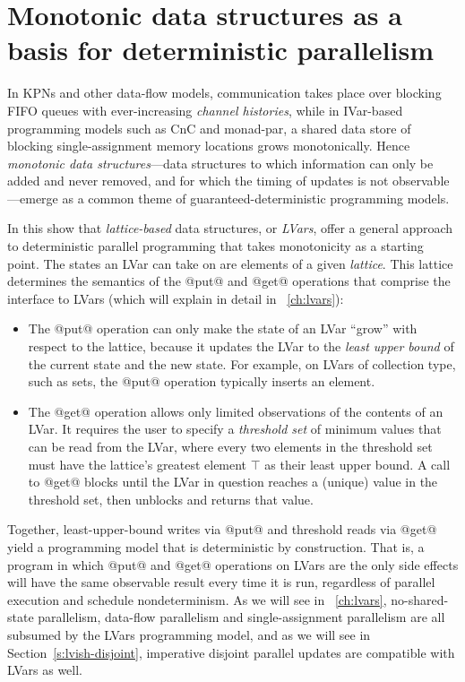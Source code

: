 \section{Monotonic data structures as a basis for deterministic parallelism}\label{s:intro-monotonic}

In KPNs and other data-flow models, communication takes place over
blocking FIFO queues with ever-increasing \emph{channel histories},
while in IVar-based programming models such as CnC and monad-par, a
shared data store of blocking single-assignment memory locations grows
monotonically.  Hence \emph{monotonic data structures}---data
structures to which information can only be added and never removed,
and for which the timing of updates is not observable---emerge as a
common theme of guaranteed-deterministic programming models.

In this  show that \emph{lattice-based} data
structures, or \emph{LVars}, offer a general approach to deterministic
parallel programming that takes monotonicity as a starting point. The
states an LVar can take on are elements of a given
\emph{lattice}.  This lattice determines the
semantics of the @put@ and @get@ operations that comprise the
interface to LVars (which  will explain in detail in
~\ref{ch:lvars}):
\begin{itemize}
\item The @put@ operation can only make the state of an LVar ``grow''
  with respect to the lattice, because it updates the LVar to the
  \emph{least upper bound} of the current state and the new state.
  For example, on LVars of collection type, such as sets, the @put@ operation
  typically inserts an element.

\item The @get@ operation allows only limited observations of the
  contents of an LVar.  It requires the user to specify a
  \emph{threshold set} of minimum values that can be read from the
  LVar, where every two elements in the threshold set must have the
  lattice's greatest element $\top$ as their least upper bound.  A
  call to @get@ blocks until the LVar in question reaches a (unique)
  value in the threshold set, then unblocks and returns that value.
\end{itemize}
Together, least-upper-bound writes via @put@ and threshold reads via
@get@ yield a programming model that is deterministic by construction.  That
is, a program in which @put@ and @get@ operations on LVars are the
only side effects will have the same observable result every time it is run, regardless of
parallel execution and schedule nondeterminism.  As we will see in ~\ref{ch:lvars}, no-shared-state parallelism, data-flow
parallelism and single-assignment parallelism are all subsumed by the
LVars programming model, and as we will see in
Section~\ref{s:lvish-disjoint}, imperative disjoint parallel updates
are compatible with LVars as well.

